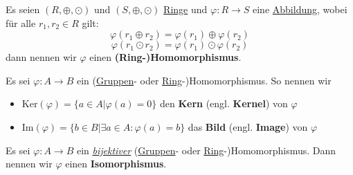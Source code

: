 \documentclass[../../main.tex]{subfiles}
\begin{document}
		\begin{definition}
			\label{def:RingHomomorphismus}
			Es seien $(R, \oplus, \odot)$ und $(S, \oplus, \odot)$ \hyperref[def:Ring]{Ringe} und $\varphi: R \rightarrow S$ eine \hyperref[def:Abbildung]{Abbildung}, wobei für alle $r_1, r_2 \in R$ gilt:
			$$\varphi(r_1 \oplus r_2) = \varphi(r_1) \oplus \varphi(r_2)$$
			$$\varphi(r_1 \odot r_2) = \varphi(r_1) \odot \varphi(r_2)$$
			dann nennen wir $\varphi$ einen \textbf{(Ring-)Homomorphismus}. 
		\end{definition}
	
		\begin{definition}
			\label{def:KernelHomomorphismus}
			\label{def:KernHomomorphismus}
			\label{def:ImageHomomorphismus}
			\label{def:BildHomomorphismus}
			Es sei $\varphi: A \rightarrow B$ ein (\hyperref[def:GruppenHomomorphismus]{Gruppen}- oder \hyperref[def:RingHomomorphismus]{Ring}-)Homomorphismus. So nennen wir 
			\begin{itemize}
				\item $\textrm{Ker}(\varphi) = \{ a \in A | \varphi(a) = 0 \}$ den \textbf{Kern} (engl. \textbf{Kernel}) von $\varphi$
				\item $\textrm{Im}(\varphi) = \{ b \in B | \exists a \in A: \varphi(a)=b \}$ das \textbf{Bild} (engl. \textbf{Image}) von $\varphi$
			\end{itemize}
		\end{definition}
	
		\begin{definition}[Isomorphismus]
			Es sei $\varphi: A \rightarrow B$ ein \hyperref[def:Bijektiv]{\textit{bijektiver}} (\hyperref[def:GruppenHomomorphismus]{Gruppen}- oder \hyperref[def:RingHomomorphismus]{Ring}-)Homomorphismus. Dann nennen wir $\varphi$ einen \textbf{Isomorphismus}. 
		\end{definition}
	
\end{document}
